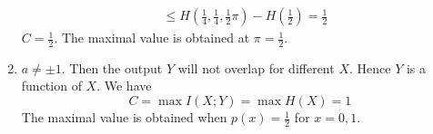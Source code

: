 \begin{exercise}
\begin{solution}
\begin{enumerate}
{\begin{equation}
\begin{aligned}
          & \leq H(\frac{1}{4},\frac{1}{4},\frac{1}{2}\pi)-H(\frac{1}{2}) = \frac{1}{2}
          \end{aligned}
        \end{equation}
        $C = \frac{1}{2}$. The maximal value is obtained at $\pi = \frac{1}{2}$.
    }
    \item{$a \neq \pm 1$. Then the output $Y$ will not overlap for different $X$. Hence $Y$ is a function of $X$. We have
    \begin{equation}
      C=\max I(X ; Y)=\max H(X) = 1
    \end{equation}
    The maximal value is obtained when $p(x) = \frac{1}{2}$ for $x=0,1$.
    }
  \end{enumerate}
  \end{solution}
  \label{ex6}
\end{exercise}

